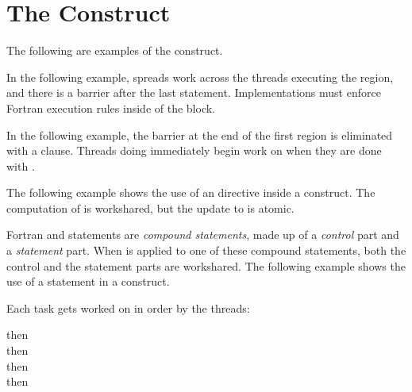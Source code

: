 \pagebreak
\chapter{The  Construct}
\fortranspecificstart
\label{chap:workshare}

The following are examples of the  construct. 

In the following example,  spreads work across the threads executing 
the  region, and there is a barrier after the last statement. 
Implementations must enforce Fortran execution rules inside of the  
block.


In the following example, the barrier at the end of the first  
region is eliminated with a  clause. Threads doing  immediately begin work on  when they are done with .

\begin{figure}[t!]
\end{figure}

The following example shows the use of an  directive inside a  
construct. The computation of  is workshared, but the update to 
 is atomic.


Fortran  and  statements are \emph{compound statements}, 
made up of a \emph{control} part and a \emph{statement} part. When  
is applied to one of these compound statements, both the control and the statement 
parts are workshared. The following example shows the use of a  statement 
in a  construct.

Each task gets worked on in order by the threads:

 then
\\
 then
\\
 then
\\
 then
\\

\begin{figure}[t!]
\end{figure}

